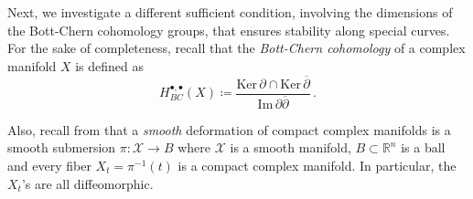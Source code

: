 \documentclass[a4paper]{amsart}
\theoremstyle{definition}
\theoremstyle{remark}
\newcommand{\bR}{{\mathbb R}}
\numberwithin{equation}{section}
\begin{document}

    
Next, we investigate a different sufficient condition, involving the dimensions of the Bott-Chern cohomology groups, that ensures stability along special curves. For the sake of completeness, recall that the \emph{Bott-Chern cohomology} of a complex manifold $X$ is defined as
\[
H^{\bullet,\bullet}_{BC}(X)\coloneqq\frac{\text{Ker}\,\partial\cap\text{Ker}\,\overline\partial}{\text{Im}\,\partial\overline\partial}\,.	
\]
	
Also, recall from \cite[Section 3]{Schweitzer} that a {\em smooth} deformation of compact complex manifolds is a smooth submersion $\pi\colon\mathcal{X}\to B$ where $\mathcal{X}$ is a smooth manifold, $B\subset\bR^n$ is a ball and every fiber $X_t=\pi^{-1}(t)$ is a compact complex manifold. In particular, the $X_t$'s are all diffeomorphic.
	
\end{document}
